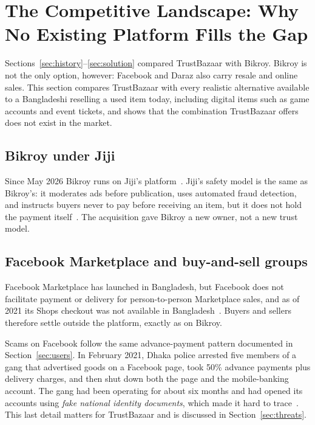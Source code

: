 \section{The Competitive Landscape: Why No Existing Platform Fills the Gap}
\label{sec:landscape}

Sections~\ref{sec:history}--\ref{sec:solution} compared TrustBazaar with Bikroy. Bikroy is not the only
option, however: Facebook and Daraz also carry resale and online sales. This section compares
TrustBazaar with every realistic alternative available to a Bangladeshi reselling a used item
today, including digital items such as game accounts and event tickets, and shows that the
combination TrustBazaar offers does not exist in the market.

\subsection{Bikroy under Jiji}

Since May 2026 Bikroy runs on Jiji's platform~\cite{fs_jiji}. Jiji's safety model is the same
as Bikroy's: it moderates ads before publication, uses automated fraud detection, and instructs
buyers never to pay before receiving an item, but it does not hold the payment
itself~\cite{jiji_kenya}. The acquisition gave Bikroy a new owner, not a new trust model.

\subsection{Facebook Marketplace and buy-and-sell groups}
\label{sec:facebook}

Facebook Marketplace has launched in Bangladesh, but Facebook does not facilitate payment or
delivery for person-to-person Marketplace sales, and as of 2021 its Shops checkout was not
available in Bangladesh~\cite{fs_facebook}. Buyers and sellers therefore settle outside the
platform, exactly as on Bikroy.

Scams on Facebook follow the same advance-payment pattern documented in
Section~\ref{sec:users}. In February 2021, Dhaka police arrested five members of a gang that
advertised goods on a Facebook page, took 50\% advance payments plus delivery charges, and then
shut down both the page and the mobile-banking account. The gang had been operating for about
six months and had opened its accounts using \emph{fake national identity documents}, which
made it hard to trace~\cite{tbs_fcommerce}. This last detail matters for TrustBazaar and is
discussed in Section~\ref{sec:threats}.

